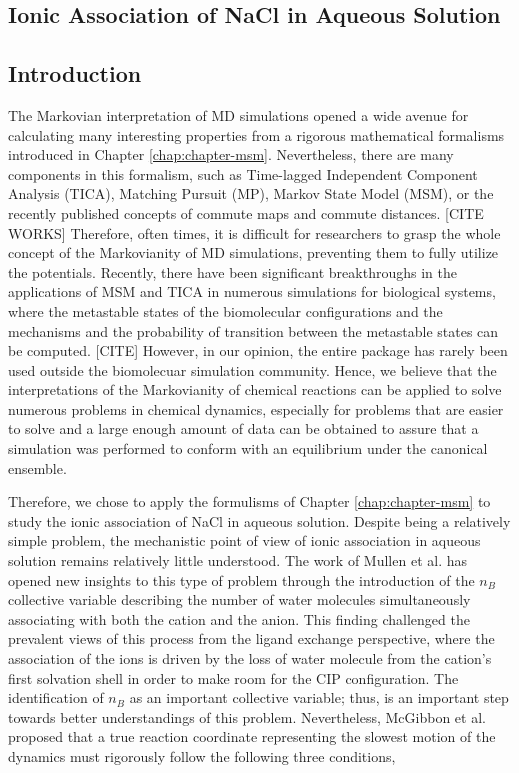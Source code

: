 \begin{spacing}{2.0}
    \chapter{Ionic Association of NaCl in Aqueous Solution}

    \section{Introduction}

    The Markovian interpretation of MD simulations opened a wide avenue for calculating many interesting properties from a rigorous mathematical 
    formalisms introduced in Chapter \ref{chap:chapter-msm}. Nevertheless, there are many components in this formalism, such as Time-lagged 
    Independent Component Analysis (TICA), Matching Pursuit (MP), Markov State Model (MSM), or the recently published concepts of commute maps and 
    commute distances. [CITE WORKS] Therefore, often times, it is difficult for researchers to grasp the whole concept of the Markovianity of MD 
    simulations, preventing them to fully utilize the potentials. Recently, there have been significant breakthroughs in the applications of MSM 
    and TICA in numerous simulations for biological systems, where the metastable states of the biomolecular configurations and the mechanisms and 
    the probability of transition between the metastable states can be computed. [CITE] However, in our opinion, the entire package has rarely been 
    used outside the biomolecuar simulation community. Hence, we believe that the interpretations of the Markovianity of chemical reactions can be 
    applied to solve numerous problems in chemical dynamics, especially for problems that are easier to solve and a large enough amount of data 
    can be obtained to assure that a simulation was performed to conform with an equilibrium under the canonical ensemble.

    Therefore, we chose to apply the formulisms of Chapter \ref{chap:chapter-msm} to study the ionic association of NaCl in aqueous solution. 
    Despite being a relatively simple problem, the mechanistic point of view of ionic association in aqueous solution remains relatively little 
    understood. The work of Mullen et al. has opened new insights to this type of problem through the introduction of the $n_B$ collective variable 
    describing the number of water molecules simultaneously associating with both the cation and the anion. \cite{P-JCTC-2014-v10-Mullen} This 
    finding challenged the prevalent views of this process from the ligand exchange perspective, where the association of the ions is driven by 
    the loss of water molecule from the cation's first solvation shell in order to make room for the CIP configuration. The identification of $n_B$
    as an important collective variable; thus, is an important step towards better understandings of this problem. Nevertheless, McGibbon et al. 
    proposed that a true reaction coordinate representing the slowest motion of the dynamics must rigorously follow the following three 
    conditions, \cite{P-JChemPhys-2017-v146-McGibbon}


\end{spacing}
